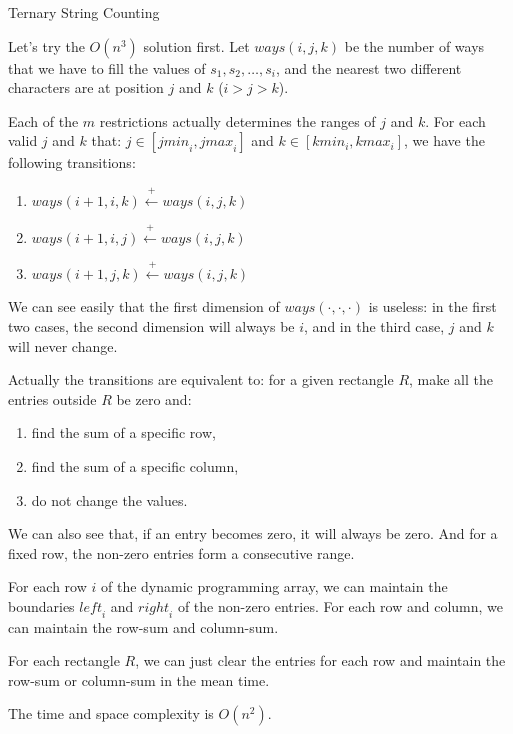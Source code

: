 \begin{tutorial}{Ternary String Counting}

Let's try the $O(n^3)$ solution first. Let $\mathit{ways}(i,j,k)$ be the number of ways that we have to fill the values of $s_1,s_2,\ldots,s_i$, and the nearest two different characters are at position $j$ and $k$ ($i > j > k$).

Each of the $m$ restrictions actually determines the ranges of $j$ and $k$. For each valid $j$ and $k$ that: $j \in [\mathit{jmin}_i, \mathit{jmax}_i]$ and $k \in [\mathit{kmin}_i, \mathit{kmax}_i]$, we have the following transitions:

\begin{enumerate}
\item $\mathit{ways}(i+1, i, k) \stackrel{+}{\leftarrow} \mathit{ways}(i, j, k)$
\item $\mathit{ways}(i+1, i, j) \stackrel{+}{\leftarrow} \mathit{ways}(i, j, k)$
\item $\mathit{ways}(i+1, j, k) \stackrel{+}{\leftarrow} \mathit{ways}(i, j, k)$
\end{enumerate}

We can see easily that the first dimension of $\mathit{ways}(\cdot,\cdot,\cdot)$ is useless: in the first two cases, the second dimension will always be $i$, and in the third case, $j$ and $k$ will never change.

Actually the transitions are equivalent to: for a given rectangle $R$, make all the entries outside $R$ be zero and:

\begin{enumerate}
\item find the sum of a specific row,
\item find the sum of a specific column,
\item do not change the values.
\end{enumerate}

We can also see that, if an entry becomes zero, it will always be zero. And for a fixed row, the non-zero entries form a consecutive range.

For each row $i$ of the dynamic programming array, we can maintain the boundaries $\mathit{left}_i$ and $\mathit{right}_i$ of the non-zero entries. For each row and column, we can maintain the row-sum and column-sum.

For each rectangle $R$, we can just clear the entries for each row and maintain the row-sum or column-sum in the mean time.

The time and space complexity is $O(n^2)$.


\end{tutorial}
